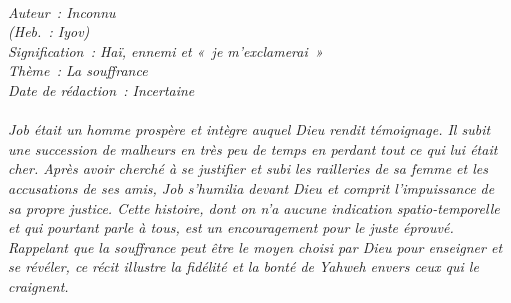 \BFont
\noindent\hrulefill
{\footnotesize
\textit{
\bigskip
{\centering{}
\\Auteur~: Inconnu
\\(Heb.~: Iyov)
\\Signification~: Haï, ennemi et «~je m'exclamerai~»
\\Thème~: La souffrance
\\Date de rédaction~: Incertaine\\}
}
\textit{
\\Job était un homme prospère et intègre auquel Dieu rendit témoignage. Il subit une succession de malheurs en très peu de temps en perdant tout ce qui lui était cher. Après avoir cherché à se justifier et subi les railleries de sa femme et les accusations de ses amis, Job s'humilia devant Dieu et comprit l'impuissance de sa propre justice. Cette histoire, dont on n'a aucune indication spatio-temporelle et qui pourtant parle à tous, est un encouragement pour le juste éprouvé.
\\Rappelant que la souffrance peut être le moyen choisi par Dieu pour enseigner et se révéler, ce récit illustre la fidélité et la bonté de Yahweh envers ceux qui le craignent.\bigskip
}
}
\par\nobreak\noindent\hrulefill
